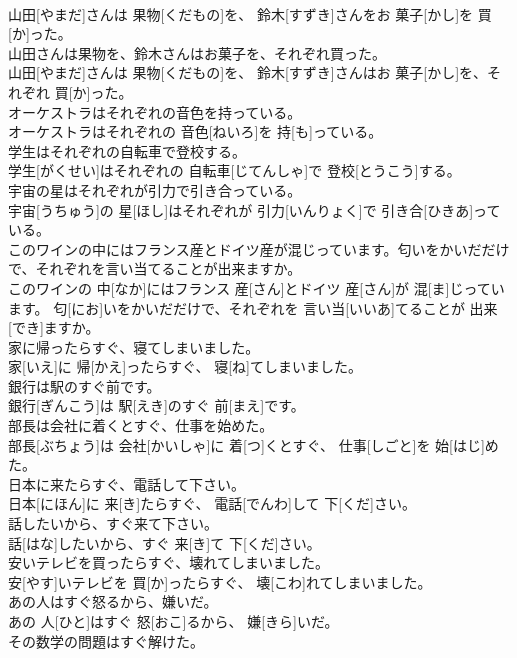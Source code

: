 \documentclass[8pt]{extreport}
\begin{document}
\begin{CJK}{UTF8}{min}
\\	山田[やまだ]さんは 果物[くだもの]を、 鈴木[すずき]さんをお 菓子[かし]を 買[か]った。
\\	山田さんは果物を、鈴木さんはお菓子を、それぞれ買った。	
\\	山田[やまだ]さんは 果物[くだもの]を、 鈴木[すずき]さんはお 菓子[かし]を、それぞれ 買[か]った。
\\	オーケストラはそれぞれの音色を持っている。	
\\	オーケストラはそれぞれの 音色[ねいろ]を 持[も]っている。
\\	学生はそれぞれの自転車で登校する。	
\\	学生[がくせい]はそれぞれの 自転車[じてんしゃ]で 登校[とうこう]する。
\\	宇宙の星はそれぞれが引力で引き合っている。	
\\	宇宙[うちゅう]の 星[ほし]はそれぞれが 引力[いんりょく]で 引き合[ひきあ]っている。
\\	このワインの中にはフランス産とドイツ産が混じっています。匂いをかいだだけで、それぞれを言い当てることが出来ますか。	
\\	このワインの 中[なか]にはフランス 産[さん]とドイツ 産[さん]が 混[ま]じっています。 匂[にお]いをかいだだけで、それぞれを 言い当[いいあ]てることが 出来[でき]ますか。
\\	家に帰ったらすぐ、寝てしまいました。	
\\	家[いえ]に 帰[かえ]ったらすぐ、 寝[ね]てしまいました。
\\	銀行は駅のすぐ前です。	
\\	銀行[ぎんこう]は 駅[えき]のすぐ 前[まえ]です。
\\	部長は会社に着くとすぐ、仕事を始めた。	
\\	部長[ぶちょう]は 会社[かいしゃ]に 着[つ]くとすぐ、 仕事[しごと]を 始[はじ]めた。
\\	日本に来たらすぐ、電話して下さい。	
\\	日本[にほん]に 来[き]たらすぐ、 電話[でんわ]して 下[くだ]さい。
\\	話したいから、すぐ来て下さい。	
\\	話[はな]したいから、すぐ 来[き]て 下[くだ]さい。
\\	安いテレビを買ったらすぐ、壊れてしまいました。	
\\	安[やす]いテレビを 買[か]ったらすぐ、 壊[こわ]れてしまいました。
\\	あの人はすぐ怒るから、嫌いだ。	
\\	あの 人[ひと]はすぐ 怒[おこ]るから、 嫌[きら]いだ。
\\	その数学の問題はすぐ解けた。	

\end{CJK}
\end{document}
